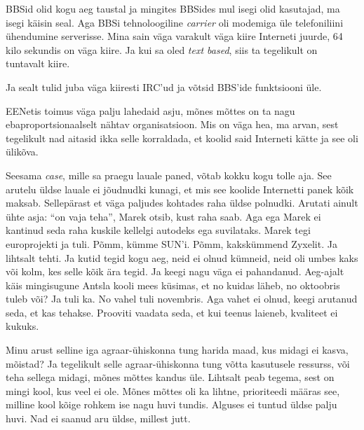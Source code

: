 
BBSid olid kogu aeg taustal ja mingites BBSides mul isegi olid kasutajad, ma 
isegi käisin seal. Aga BBSi tehnoloogiline \emph{carrier} oli modemiga üle
telefoniliini ühendumine serverisse. Mina sain väga varakult väga kiire 
Interneti juurde, 64 kilo sekundis on väga kiire. Ja kui sa oled \emph{text 
based}, siis ta tegelikult on  tuntavalt kiire. 

Ja sealt tulid juba väga kiiresti IRC'ud ja võtsid BBS'ide funktsiooni üle. 

EENetis toimus väga palju lahedaid asju, mõnes mõttes on ta nagu 
ebaproportsionaalselt nähtav organisatsioon. Mis on  väga hea, ma arvan, sest 
tegelikult nad aitasid ikka selle korraldada, et koolid said Interneti kätte ja 
see oli ülikõva.


Seesama \emph{case}, mille sa praegu lauale paned, võtab kokku kogu tolle aja. 
See arutelu üldse lauale ei  jõudnudki kunagi, et mis see koolide Internetti 
panek kõik maksab. Sellepärast et väga paljudes kohtades raha  üldse polnudki. 
Arutati ainult ühte asja: \enquote{on vaja teha}, Marek otsib, kust raha saab. Aga ega Marek ei kantinud seda raha kuskile 
kellelgi autodeks ega suvilataks. Marek tegi  europrojekti ja tuli. Põmm, kümme 
SUN'i. Põmm, kakskümmend Zyxelit. Ja lihtsalt tehti. Ja kutid tegid kogu aeg, 
neid ei olnud kümneid, neid oli umbes kaks või kolm, kes selle kõik ära tegid. 
Ja keegi nagu väga ei pahandanud. Aeg-ajalt käis mingisugune  Antsla kooli mees 
küsimas, et no kuidas läheb, no oktoobris tuleb või? Ja tuli ka. No vahel 
tuli novembris. Aga vahet ei olnud, keegi arutanud seda, et kas tehakse. 
Prooviti vaadata seda, et kui teenus laieneb,  kvaliteet ei kukuks. 


Minu arust selline iga agraar-ühiskonna tung harida maad, kus midagi ei kasva, 
mõistad? Ja tegelikult selle agraar-ühiskonna tung võtta kasutusele ressurss, 
või teha sellega midagi, mõnes mõttes kandus üle. Lihtsalt peab tegema, sest  on 
 mingi kool, kus veel ei ole. Mõnes mõttes oli ka lihtne, prioriteedi määras 
see, milline kool kõige rohkem ise nagu huvi tundis. Alguses ei tuntud üldse 
palju huvi. Nad ei saanud aru üldse, millest jutt.

